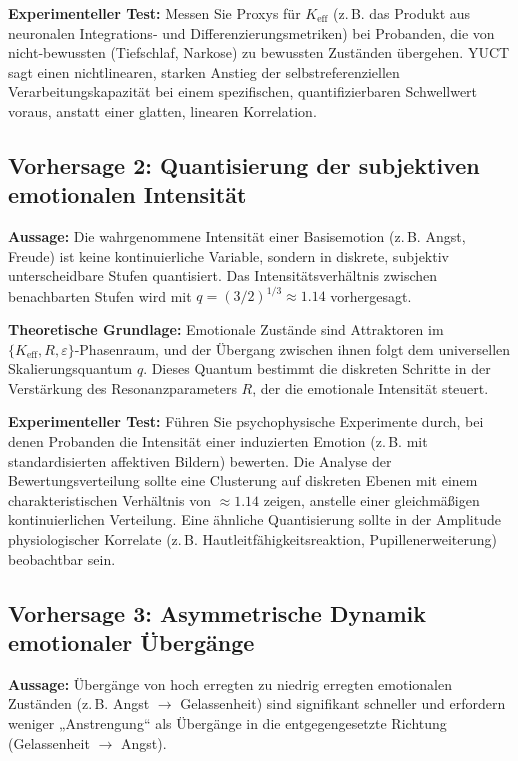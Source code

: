 \documentclass[12pt,a4paper]{article}
\begin{document}
	\textbf{Experimenteller Test:} Messen Sie Proxys für \(K_{\mathrm{eff}}\) (z. B. das Produkt aus neuronalen Integrations‑ und Differenzierungsmetriken) bei Probanden, die von nicht‑bewussten (Tiefschlaf, Narkose) zu bewussten Zuständen übergehen. YUCT sagt einen nichtlinearen, starken Anstieg der selbstreferenziellen Verarbeitungskapazität bei einem spezifischen, quantifizierbaren Schwellwert voraus, anstatt einer glatten, linearen Korrelation.
	
	\subsection{Vorhersage 2: Quantisierung der subjektiven emotionalen Intensität}
	
	\textbf{Aussage:} Die wahrgenommene Intensität einer Basisemotion (z. B. Angst, Freude) ist keine kontinuierliche Variable, sondern in diskrete, subjektiv unterscheidbare Stufen quantisiert. Das Intensitätsverhältnis zwischen benachbarten Stufen wird mit \(q = (3/2)^{1/3} \approx 1.14\) vorhergesagt.
	
	\textbf{Theoretische Grundlage:} Emotionale Zustände sind Attraktoren im \(\{K_{\mathrm{eff}}, R, \varepsilon\}\)-Phasenraum, und der Übergang zwischen ihnen folgt dem universellen Skalierungsquantum \(q\). Dieses Quantum bestimmt die diskreten Schritte in der Verstärkung des Resonanzparameters \(R\), der die emotionale Intensität steuert.
	
	\textbf{Experimenteller Test:} Führen Sie psychophysische Experimente durch, bei denen Probanden die Intensität einer induzierten Emotion (z. B. mit standardisierten affektiven Bildern) bewerten. Die Analyse der Bewertungsverteilung sollte eine Clusterung auf diskreten Ebenen mit einem charakteristischen Verhältnis von \(\approx 1.14\) zeigen, anstelle einer gleichmäßigen kontinuierlichen Verteilung. Eine ähnliche Quantisierung sollte in der Amplitude physiologischer Korrelate (z. B. Hautleitfähigkeitsreaktion, Pupillenerweiterung) beobachtbar sein.
	
	\subsection{Vorhersage 3: Asymmetrische Dynamik emotionaler Übergänge}
	
	\textbf{Aussage:} Übergänge von hoch erregten zu niedrig erregten emotionalen Zuständen (z. B. Angst \(\rightarrow\) Gelassenheit) sind signifikant schneller und erfordern weniger „Anstrengung“ als Übergänge in die entgegengesetzte Richtung (Gelassenheit \(\rightarrow\) Angst).
	
\end{document}
